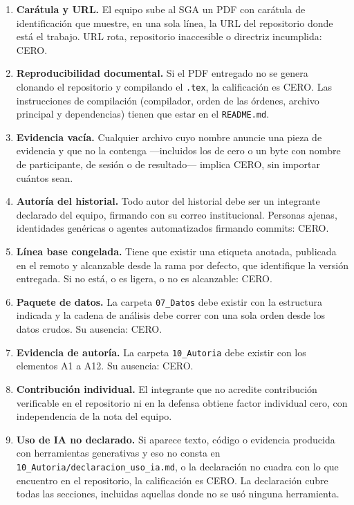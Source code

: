 \documentclass[11pt,a4paper]{article}
\begin{document}
\begin{cajapiso}
\begin{enumerate}[label=\textbf{P\arabic*.}]
    \item \textbf{Carátula y URL.} El equipo sube al SGA un PDF con carátula de identificación que muestre, en una sola línea, la URL del repositorio donde está el trabajo. URL rota, repositorio inaccesible o directriz incumplida: CERO.
    \item \textbf{Reproducibilidad documental.} Si el PDF entregado no se genera clonando el repositorio y compilando el \texttt{.tex}, la calificación es CERO. Las instrucciones de compilación (compilador, orden de las órdenes, archivo principal y dependencias) tienen que estar en el \texttt{README.md}.
    \item \textbf{Evidencia vacía.} Cualquier archivo cuyo nombre anuncie una pieza de evidencia y que no la contenga —incluidos los de cero o un byte con nombre de participante, de sesión o de resultado— implica CERO, sin importar cuántos sean.
    \item \textbf{Autoría del historial.} Todo autor del historial debe ser un integrante declarado del equipo, firmando con su correo institucional. Personas ajenas, identidades genéricas o agentes automatizados firmando commits: CERO.
    \item \textbf{Línea base congelada.} Tiene que existir una etiqueta anotada, publicada en el remoto y alcanzable desde la rama por defecto, que identifique la versión entregada. Si no está, o es ligera, o no es alcanzable: CERO.
    \item \textbf{Paquete de datos.} La carpeta \texttt{07\_Datos} debe existir con la estructura indicada y la cadena de análisis debe correr con una sola orden desde los datos crudos. Su ausencia: CERO.
    \item \textbf{Evidencia de autoría.} La carpeta \texttt{10\_Autoria} debe existir con los elementos A1 a A12. Su ausencia: CERO.
    \item \textbf{Contribución individual.} El integrante que no acredite contribución verificable en el repositorio ni en la defensa obtiene factor individual cero, con independencia de la nota del equipo.
    \item \textbf{Uso de IA no declarado.} Si aparece texto, código o evidencia producida con herramientas generativas y eso no consta en \texttt{10\_Autoria/declaracion\_uso\_ia.md}, o la declaración no cuadra con lo que encuentro en el repositorio, la calificación es CERO. La declaración cubre todas las secciones, incluidas aquellas donde no se usó ninguna herramienta.
\end{enumerate}
\end{cajapiso}
\end{document}
